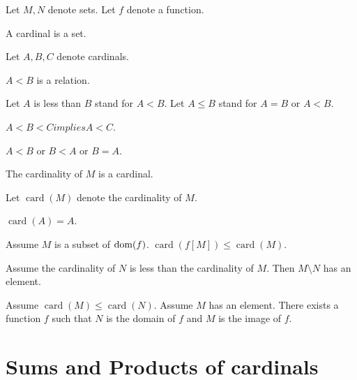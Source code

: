 \documentclass{article}
\newcommand{\card}[1]{\operatorname{card}(#1)}
\begin{document}
\begin{forthel}
  Let $M, N$ denote sets.
  Let $f$ denote a function.

  \begin{signature}
    A cardinal is a set.
  \end{signature}

  Let $A, B, C$ denote cardinals.

  \begin{signature}
    $A < B$ is a relation.
  \end{signature}

  Let $A$ is less than $B$ stand for $A < B$.
  Let $A \leq B$ stand for $A = B$ or $A < B$.

  \begin{axiom}
    $A < B < C implies A < C$.
  \end{axiom}

  \begin{axiom}
    $A < B$ or $B < A$ or $B = A$.
  \end{axiom}

  \begin{signature}
    The cardinality of $M$ is a cardinal.
  \end{signature}

  Let $\card{M}$ denote the cardinality of $M$.

  \begin{axiom}
    $\card{A} = A$.
  \end{axiom}

  \begin{axiom}
    Assume $M$ is a subset of $\operatorname{dom}(f)$.
    $\card{f[M]} \leq \card{M}$.
  \end{axiom}

  \begin{axiom}
    Assume the cardinality of $N$ is less than the cardinality of $M$.
    Then $M \setminus N$ has an element.
  \end{axiom}

  \begin{axiom}\label{function_existence}
    Assume $\card{M} \leq \card{N}$.
    Assume $M$ has an element.
    There exists a function $f$ such that $N$ is the domain of $f$ and $M$ is
    the image of $f$.
  \end{axiom}
\end{forthel}


\section{Sums and Products of cardinals}
\end{document}
